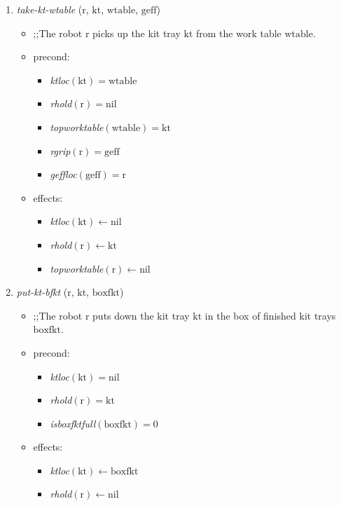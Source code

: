\begin{small}
\begin{enumerate}
\item \textsl{take-kt-wtable} ($\mathrm{r}$, $\mathrm{kt}$, $\mathrm{wtable}$, $\mathrm{geff}$)
\begin{itemize}
\item ;;The robot $\mathrm{r}$ picks up the kit tray $\mathrm{kt}$ from the work table $\mathrm{wtable}$.
\item precond:
\begin{itemize}
\item[]\emph{ktloc}$\mathrm{(kt)=wtable}$
\item[]\emph{rhold}$\mathrm{(r)=nil}$
\item[]\emph{topworktable}$\mathrm{(wtable)=kt}$
\item[]\emph{rgrip}$\mathrm{(r)=geff}$
\item[]\emph{geffloc}$\mathrm{(geff)=r}$
\end{itemize}
\item effects:
\begin{itemize}
\item[]\emph{ktloc}$\mathrm{(kt)\leftarrow nil}$
\item[]\emph{rhold}$\mathrm{(r)\leftarrow kt}$
\item[]\emph{topworktable}$\mathrm{(r)\leftarrow nil}$
\end{itemize}
\end{itemize}

\item \textsl{put-kt-bfkt} ($\mathrm{r}$, $\mathrm{kt}$, $\mathrm{boxfkt}$)
\begin{itemize}
\item ;;The robot $\mathrm{r}$ puts down the kit tray $\mathrm{kt}$ in the box of finished kit trays $\mathrm{boxfkt}$.
\item precond:
\begin{itemize}
\item[]\emph{ktloc}$\mathrm{(kt)=nil}$
\item[]\emph{rhold}$\mathrm{(r)=kt}$
\item[]\emph{isboxfktfull}$\mathrm{(boxfkt)=0}$
\end{itemize}
\item effects:
\begin{itemize}
\item[]\emph{ktloc}$\mathrm{(kt)\leftarrow boxfkt}$
\item[]\emph{rhold}$\mathrm{(r)\leftarrow nil}$
\end{itemize}
\end{itemize}


\end{enumerate}
\end{small}

